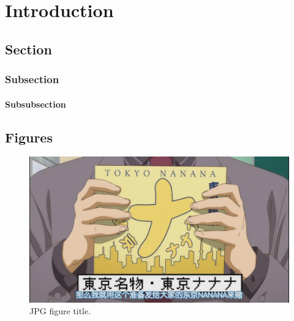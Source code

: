 \chapter{Introduction}

\section{Section}\label{sec:example}
\subsection{Subsection}\label{sec:example2}
\subsubsection{Subsubsection}






\section{Figures}

\begin{figure}[ht]
\centering 
\includegraphics[scale=0.4]{Figures/jpgFigure.jpg}
\caption{JPG figure title.}
\label{fig:jpgFigure}
\end{figure}

